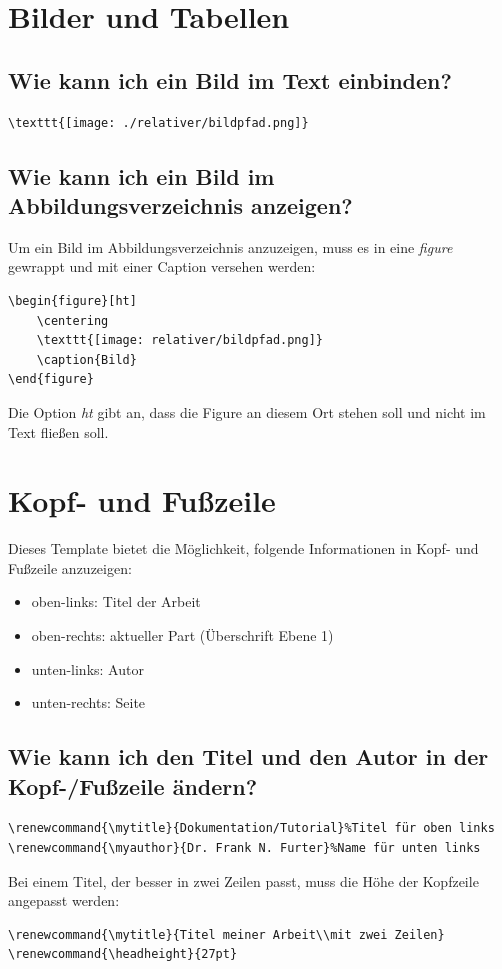 \documentclass[12pt]{article}
\begin{document}
\section{Bilder und Tabellen}
\subsection{Wie kann ich ein Bild im Text einbinden?}
\begin{verbatim}
\texttt{[image: ./relativer/bildpfad.png]}
\end{verbatim}

\subsection{Wie kann ich ein Bild im Abbildungsverzeichnis anzeigen?}
Um ein Bild im Abbildungsverzeichnis anzuzeigen, muss es in eine \textit{figure} gewrappt und mit einer Caption versehen werden:
\begin{verbatim}
\begin{figure}[ht]
    \centering
    \texttt{[image: relativer/bildpfad.png]}
    \caption{Bild}
\end{figure}
\end{verbatim}
\noindent Die Option \textit{ht} gibt an, dass die Figure an diesem Ort stehen soll und nicht im Text fließen soll.

\section{Kopf- und Fußzeile}
Dieses Template bietet die Möglichkeit, folgende Informationen in Kopf- und Fußzeile anzuzeigen:
\begin{itemize}
\item oben-links: Titel der Arbeit
\item oben-rechts: aktueller Part (Überschrift Ebene 1)
\item unten-links: Autor
\item unten-rechts: Seite
\end{itemize}

\subsection{Wie kann ich den Titel und den Autor in der Kopf-/Fußzeile ändern?}
\begin{verbatim}
\renewcommand{\mytitle}{Dokumentation/Tutorial}%Titel für oben links
\renewcommand{\myauthor}{Dr. Frank N. Furter}%Name für unten links
\end{verbatim}
Bei einem Titel, der besser in zwei Zeilen passt, muss die Höhe der Kopfzeile angepasst werden:
\begin{verbatim}
\renewcommand{\mytitle}{Titel meiner Arbeit\\mit zwei Zeilen}
\renewcommand{\headheight}{27pt}
\end{verbatim}
\end{document}
